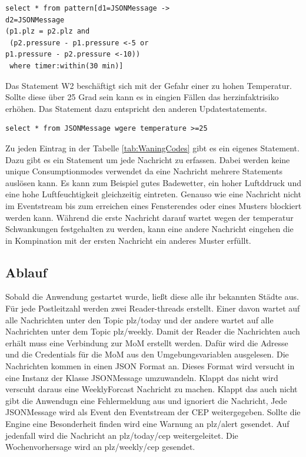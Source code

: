 \begin{lstlisting}
select * from pattern[d1=JSONMessage ->
d2=JSONMessage
(p1.plz = p2.plz and
 (p2.pressure - p1.pressure <-5 or 
p1.pressure - p2.pressure <-10))
 where timer:within(30 min)]
\end{lstlisting} Das Statement W2 beschäftigt sich mit der Gefahr einer zu hohen Temperatur. Sollte diese über 25 Grad sein kann es in eingien Fällen das herzinfaktrisiko erhöhen. Das Statement dazu entspricht den anderen Updatestatements. 

\begin{lstlisting}
select * from JSONMessage wgere temperature >=25
\end{lstlisting}
 Zu jeden Eintrag in der Tabelle \ref{tab:WaningCodes} gibt es ein eigenes Statement. Dazu gibt es ein Statement um jede Nachricht zu erfassen. Dabei werden keine unique Consumptionmodes verwendet da eine Nachricht mehrere Statements auslösen kann. Es kann zum Beispiel gutes Badewetter, ein hoher Luftddruck und eine hohe Luftfeuchtigkeit gleichzeitig eintreten. Genauso wie eine Nachricht nicht im Eventstream bis zum erreichen eines Fensterendes oder eines Musters blockiert werden kann. Während die erste Nachricht darauf wartet wegen der temperatur Schwankungen festgehalten zu werden, kann eine andere Nachricht eingehen die in Kompination mit der ersten Nachricht ein anderes Muster erfüllt.  
\subsection{Ablauf}
Sobald die Anwendung gestartet wurde, ließt diese alle ihr bekannten Städte aus. Für jede Postleitzahl werden zwei Reader-threads erstellt. Einer davon wartet auf alle Nachrichten unter den Topic plz/today und der andere wartet auf alle Nachrichten unter dem Topic plz/weekly. Damit der Reader die Nachrichten auch erhält muss eine Verbindung zur MoM erstellt werden. Dafür wird die Adresse und die Credentials für die MoM aus den Umgebungsvariablen ausgelesen. Die Nachrichten kommen in einen JSON Format an. Dieses Format wird versucht in eine Instanz der Klasse JSONMessage umzuwandeln. Klappt das nicht wird verscuht daraus eine WeeklyForcast Nachricht zu machen. Klappt das auch nicht gibt die Anwendugn eine Fehlermeldung aus und ignoriert die Nachricht, Jede JSONMessage wird als Event den Eventstream der CEP weitergegeben. Sollte die Engine eine Besonderheit finden wird eine Warnung an plz/alert gesendet. Auf jedenfall wird die Nachricht an plz/today/cep weitergeleitet. Die Wochenvorhersage wird an plz/weekly/cep gesendet.  
